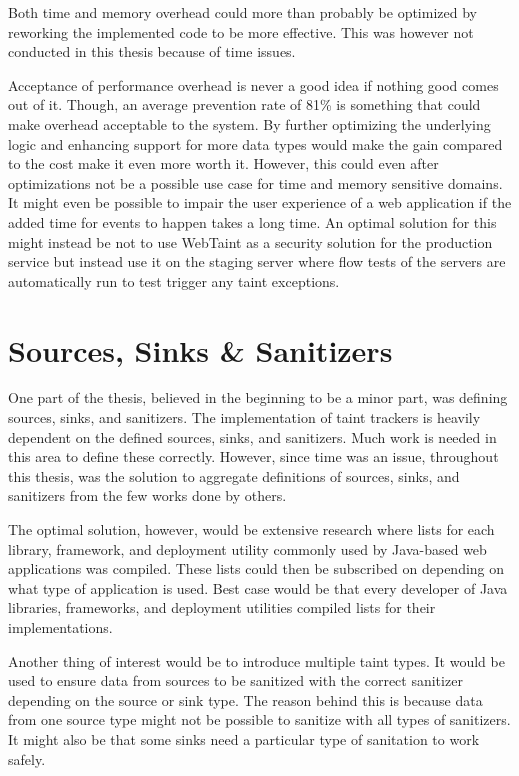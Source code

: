 Both time and memory overhead could more than probably be optimized by reworking the implemented code to be more effective. This was however not conducted in this thesis because of time issues.

Acceptance of performance overhead is never a good idea if nothing good comes out of it. Though, an average prevention rate of 81\% is something that could make overhead acceptable to the system. By further optimizing the underlying logic and enhancing support for more data types would make the gain compared to the cost make it even more worth it. However, this could even after optimizations not be a possible use case for time and memory sensitive domains. It might even be possible to impair the user experience of a web application if the added time for events to happen takes a long time. An optimal solution for this might instead be not to use WebTaint as a security solution for the production service but instead use it on the staging server where flow tests of the servers are automatically run to test trigger any taint exceptions.



\section{Sources, Sinks \& Sanitizers}
\label{sss}
One part of the thesis, believed in the beginning to be a minor part, was defining sources, sinks, and sanitizers. The implementation of taint trackers is heavily dependent on the defined sources, sinks, and sanitizers. Much work is needed in this area to define these correctly. However, since time was an issue, throughout this thesis, was the solution to aggregate definitions of sources, sinks, and sanitizers from the few works done by others. 

The optimal solution, however, would be extensive research where lists for each library, framework, and deployment utility commonly used by Java-based web applications was compiled. These lists could then be subscribed on depending on what type of application is used. Best case would be that every developer of Java libraries, frameworks, and deployment utilities compiled lists for their implementations.

Another thing of interest would be to introduce multiple taint types. It would be used to ensure data from sources to be sanitized with the correct sanitizer depending on the source or sink type. The reason behind this is because data from one source type might not be possible to sanitize with all types of sanitizers. It might also be that some sinks need a particular type of sanitation to work safely. 

